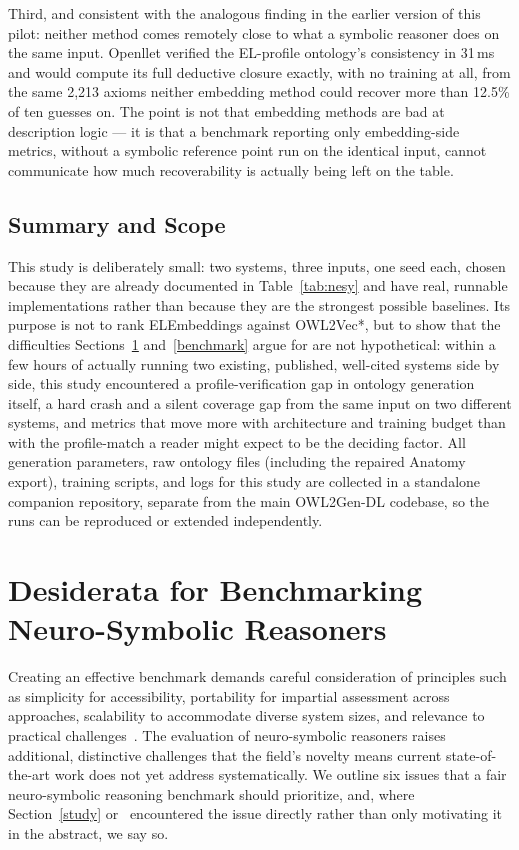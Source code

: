 Third, and consistent with the analogous finding in the earlier version of this pilot: neither method comes remotely close to what a symbolic reasoner does on the same input. Openllet verified the EL-profile ontology's consistency in 31\,ms and would compute its full deductive closure exactly, with no training at all, from the same 2{,}213 axioms neither embedding method could recover more than 12.5\% of ten guesses on. The point is not that embedding methods are bad at description logic — it is that a benchmark reporting only embedding-side metrics, without a symbolic reference point run on the identical input, cannot communicate how much recoverability is actually being left on the table.

\subsection{Summary and Scope}

This study is deliberately small: two systems, three inputs, one seed each, chosen because they are already documented in Table~\ref{tab:nesy} and have real, runnable implementations rather than because they are the strongest possible baselines. Its purpose is not to rank ELEmbeddings against OWL2Vec*, but to show that the difficulties Sections~\ref{desiderata} and~\ref{benchmark} argue for are not hypothetical: within a few hours of actually running two existing, published, well-cited systems side by side, this study encountered a profile-verification gap in ontology generation itself, a hard crash and a silent coverage gap from the same input on two different systems, and metrics that move more with architecture and training budget than with the profile-match a reader might expect to be the deciding factor. All generation parameters, raw ontology files (including the repaired Anatomy export), training scripts, and logs for this study are collected in a standalone companion repository, separate from the main OWL2Gen-DL codebase, so the runs can be reproduced or extended independently.

\section{Desiderata for Benchmarking Neuro-Symbolic Reasoners}
\label{desiderata}

Creating an effective benchmark demands careful consideration of principles such as simplicity for accessibility, portability for impartial assessment across approaches, scalability to accommodate diverse system sizes, and relevance to practical challenges~\cite{jimgray}. The evaluation of neuro-symbolic reasoners raises additional, distinctive challenges that the field's novelty means current state-of-the-art work does not yet address systematically. We outline six issues that a fair neuro-symbolic reasoning benchmark should prioritize, and, where Section~\ref{study} or~\cite{loesch2024nsorn} encountered the issue directly rather than only motivating it in the abstract, we say so.

